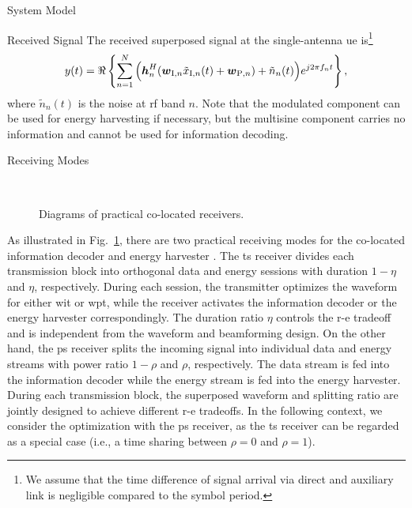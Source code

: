 \begin{section}{System Model}
	\begin{subsection}{Received Signal}
		The received superposed signal at the single-antenna \gls{ue} is\footnote{We assume that the time difference of signal arrival via direct and auxiliary link is negligible compared to the symbol period.}
		\begin{equation}
			y(t) = \Re\left\{\sum_{n=1}^N{\Bigl(\boldsymbol{h}_{n}^H}{(\boldsymbol{w}_{\mathrm{I},n}\tilde{x}_{\mathrm{I},n}(t)+\boldsymbol{w}_{\mathrm{P},n})+\tilde{n}_n(t)\Bigr)}{e^{j2{\pi}{f_n}{t}}}\right\},
		\end{equation}
		where $\tilde{n}_n(t)$ is the noise at \gls{rf} band $n$. Note that the modulated component can be used for energy harvesting if necessary, but the multisine component carries no information and cannot be used for information decoding.
	\end{subsection}


	\begin{subsection}{Receiving Modes}
		\begin{figure}[!t]
			\centering
			\\
			\caption{Diagrams of practical co-located receivers.}
			\label{fi:receiver}
		\end{figure}

		As illustrated in Fig.~\ref{fi:receiver}, there are two practical receiving modes for the co-located information decoder and energy harvester \cite{Zhou2013}. The \gls{ts} receiver divides each transmission block into orthogonal data and energy sessions with duration $1-\eta$ and $\eta$, respectively. During each session, the transmitter optimizes the waveform for either \gls{wit} or \gls{wpt}, while the receiver activates the information decoder or the energy harvester correspondingly. The duration ratio $\eta$ controls the \gls{r-e} tradeoff and is independent from the waveform and beamforming design. On the other hand, the \gls{ps} receiver splits the incoming signal into individual data and energy streams with power ratio $1-\rho$ and $\rho$, respectively. The data stream is fed into the information decoder while the energy stream is fed into the energy harvester. During each transmission block, the superposed waveform and splitting ratio are jointly designed to achieve different \gls{r-e} tradeoffs. In the following context, we consider the optimization with the \gls{ps} receiver, as the \gls{ts} receiver can be regarded as a special case (i.e., a time sharing between $\rho=0$ and $\rho=1$).
	\end{subsection}



\end{section}

